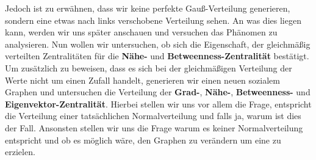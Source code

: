 Jedoch ist zu erwähnen, dass wir keine perfekte Gauß-Verteilung generieren, sondern eine etwas nach links verschobene Verteilung sehen. An was dies liegen kann, werden wir uns später anschauen und versuchen das Phänomen zu analysieren. Nun wollen wir untersuchen, ob sich die Eigenschaft, der gleichmäßig verteilten Zentralitäten für die \textbf{Nähe-} und \textbf{Betweenness-Zentralität} bestätigt. Um zusätzlich zu beweisen, dass es sich bei der gleichmäßigen Verteilung der Werte nicht um einen Zufall handelt, generieren wir einen neuen sozialem Graphen und untersuchen die Verteilung der \textbf{Grad-}, \textbf{Nähe-}, \textbf{Betweenness-} und \textbf{Eigenvektor-Zentralität}. Hierbei stellen wir uns vor allem die Frage, entspricht die Verteilung einer tatsächlichen Normalverteilung und falls ja, warum ist dies der Fall. Ansonsten stellen wir uns die Frage warum es keiner Normalverteilung entspricht und ob es möglich wäre, den Graphen zu verändern um eine zu erzielen.

